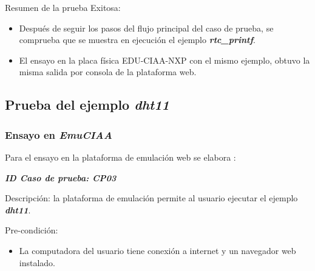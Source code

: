 Resumen de la prueba Exitosa:
\begin{itemize}
	\item Después de seguir los pasos del flujo principal del caso de prueba, se comprueba que se muestra en ejecución el ejemplo \textit{\textbf{rtc\_printf}}.
	\item El ensayo en la placa física EDU-CIAA-NXP con el mismo ejemplo, obtuvo la misma salida por consola de la plataforma web.
\end{itemize}


\subsection{Prueba del ejemplo \textit{\textbf{dht11}} }

\subsubsection{Ensayo en \textit{EmuCIAA}} 

Para el ensayo en la plataforma de emulación web se elabora :

\textit{\textbf{ID Caso de prueba: CP03}}

Descripción: la plataforma de emulación permite al usuario ejecutar el ejemplo \textit{\textbf{dht11}}.

Pre-condición: 
\begin{itemize}
	\item La computadora del usuario tiene conexión a internet y un navegador web instalado.
\end{itemize}


